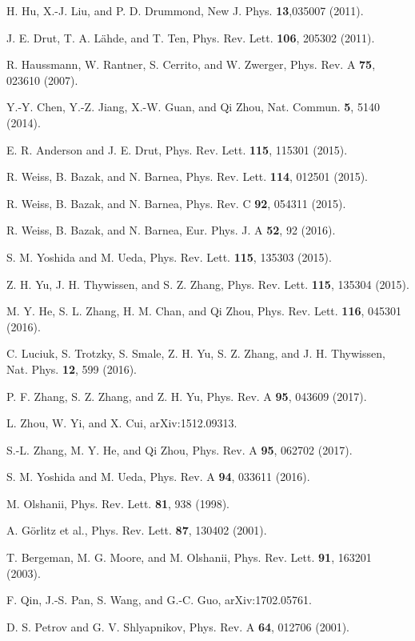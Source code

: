 \documentclass[twocolumn, prl]{revtex4}
\begin{document}
\begin{thebibliography}{99}
 H. Hu, X.-J. Liu, and P. D. Drummond, {New J. Phys.} {\bf 13},035007 (2011).

 J. E. Drut, T. A. L\"{a}hde, and T. Ten, {Phys. Rev. Lett.} {\bf 106}, 205302 (2011).

 R. Haussmann, W. Rantner, S. Cerrito, and W. Zwerger, {Phys. Rev. A} {\bf 75}, 023610 (2007).

  Y.-Y. Chen, Y.-Z. Jiang, X.-W. Guan, and Qi Zhou, {Nat. Commun.} {\bf 5}, 5140 (2014).

 E. R. Anderson and J. E. Drut, {Phys. Rev. Lett.} {\bf 115}, 115301 (2015).

 R. Weiss, B. Bazak, and N. Barnea, {Phys. Rev. Lett.} {\bf 114}, 012501 (2015).

 R. Weiss, B. Bazak, and N. Barnea, {Phys. Rev. C} {\bf 92}, 054311 (2015).

 R. Weiss, B. Bazak, and N. Barnea, {Eur. Phys. J. A} {\bf 52}, 92 (2016).

 S. M. Yoshida and M. Ueda, {Phys. Rev. Lett.} {\bf 115}, 135303 (2015).

 Z. H. Yu, J. H. Thywissen, and S. Z. Zhang, {Phys. Rev. Lett.} {\bf 115}, 135304 (2015).

 M. Y. He, S. L. Zhang, H. M. Chan, and Qi Zhou, {Phys. Rev. Lett.} {\bf 116}, 045301 (2016).

 C. Luciuk, S. Trotzky, S. Smale, Z. H. Yu, S. Z. Zhang, and J. H. Thywissen, {Nat. Phys.} {\bf 12}, 599 (2016).

 P. F. Zhang, S. Z. Zhang, and Z. H. Yu, {Phys. Rev. A} {\bf 95}, 043609 (2017).

 L. Zhou, W. Yi, and X. Cui, arXiv:1512.09313.

 S.-L. Zhang, M. Y. He, and Qi Zhou, {Phys. Rev. A} {\bf 95}, 062702 (2017).

 S. M. Yoshida and M. Ueda, {Phys. Rev. A} {\bf 94}, 033611 (2016).

 M. Olshanii, {Phys. Rev. Lett.} {\bf {81}}, 938 (1998).

 A. G\"{o}rlitz et al., {Phys. Rev. Lett.} {\bf 87}, 130402 (2001).

 T. Bergeman, M. G. Moore, and M. Olshanii, {Phys. Rev. Lett.} {\bf {91}}, 163201 (2003).

 F. Qin, J.-S. Pan, S. Wang, and G.-C. Guo, arXiv:1702.05761.

 D. S. Petrov and G. V. Shlyapnikov, {Phys. Rev. A} {\bf {64}}, 012706 (2001).


\end{thebibliography}
\end{document}
